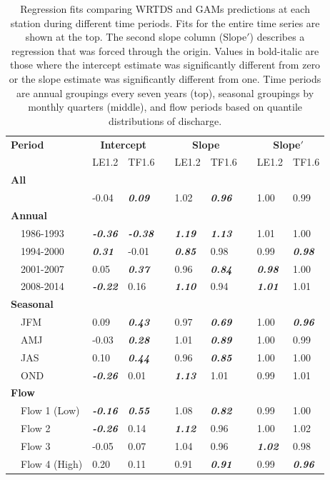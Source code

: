 \documentclass[letterpaper,12pt,oneside]{article}\usepackage[]{graphicx}\usepackage[]{color}
\begin{document}
\begin{table}[!tbp]
\caption{Regression fits comparing \ac{WRTDS} and \acp{GAM} predictions at each station during different time periods.  Fits for the entire time series are shown at the top.  The second slope column (Slope$'$) describes a regression that was forced through the origin.  Values in bold-italic are those where the intercept estimate was significantly different from zero or the slope estimate was significantly different from one.   Time periods are annual groupings every seven years (top), seasonal groupings by monthly quarters (middle), and flow periods based on quantile distributions of discharge.\label{tab:regpred}} 
\begin{center}
\begin{tabular}{lllcllcll}
\hline\hline
\multicolumn{1}{l}{\bfseries Period}&\multicolumn{2}{c}{\bfseries Intercept}&\multicolumn{1}{c}{\bfseries }&\multicolumn{2}{c}{\bfseries Slope}&\multicolumn{1}{c}{\bfseries }&\multicolumn{2}{c}{\bfseries Slope$'$}\tabularnewline
\cline{2-3} \cline{5-6} \cline{8-9}
\multicolumn{1}{l}{}&\multicolumn{1}{c}{LE1.2}&\multicolumn{1}{c}{TF1.6}&\multicolumn{1}{c}{}&\multicolumn{1}{c}{LE1.2}&\multicolumn{1}{c}{TF1.6}&\multicolumn{1}{c}{}&\multicolumn{1}{c}{LE1.2}&\multicolumn{1}{c}{TF1.6}\tabularnewline
\hline
{\bfseries All}&&&&&&&&\tabularnewline
~~&-0.04&{\bf \textit{0.09}}&&1.02&{\bf \textit{0.96}}&&1.00&0.99\tabularnewline
\hline
{\bfseries Annual}&&&&&&&&\tabularnewline
~~1986-1993&{\bf \textit{-0.36}}&{\bf \textit{-0.38}}&&{\bf \textit{1.19}}&{\bf \textit{1.13}}&&1.01&1.00\tabularnewline
~~1994-2000&{\bf \textit{0.31}}&-0.01&&{\bf \textit{0.85}}&0.98&&0.99&{\bf \textit{0.98}}\tabularnewline
~~2001-2007&0.05&{\bf \textit{0.37}}&&0.96&{\bf \textit{0.84}}&&{\bf \textit{0.98}}&1.00\tabularnewline
~~2008-2014&{\bf \textit{-0.22}}&0.16&&{\bf \textit{1.10}}&0.94&&{\bf \textit{1.01}}&1.01\tabularnewline
\hline
{\bfseries Seasonal}&&&&&&&&\tabularnewline
~~JFM&0.09&{\bf \textit{0.43}}&&0.97&{\bf \textit{0.69}}&&1.00&{\bf \textit{0.96}}\tabularnewline
~~AMJ&-0.03&{\bf \textit{0.28}}&&1.01&{\bf \textit{0.89}}&&1.00&0.99\tabularnewline
~~JAS&0.10&{\bf \textit{0.44}}&&0.96&{\bf \textit{0.85}}&&1.00&1.00\tabularnewline
~~OND&{\bf \textit{-0.26}}&0.01&&{\bf \textit{1.13}}&1.01&&0.99&1.01\tabularnewline
\hline
{\bfseries Flow}&&&&&&&&\tabularnewline
~~Flow 1 (Low)&{\bf \textit{-0.16}}&{\bf \textit{0.55}}&&1.08&{\bf \textit{0.82}}&&0.99&1.00\tabularnewline
~~Flow 2&{\bf \textit{-0.26}}&0.14&&{\bf \textit{1.12}}&0.96&&1.00&1.02\tabularnewline
~~Flow 3&-0.05&0.07&&1.04&0.96&&{\bf \textit{1.02}}&0.98\tabularnewline
~~Flow 4 (High)&0.20&0.11&&0.91&{\bf \textit{0.91}}&&0.99&{\bf \textit{0.96}}\tabularnewline
\hline
\end{tabular}\end{center}

\end{table}
\end{document}
